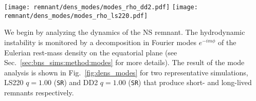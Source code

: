 \begin{figure*}[t]
    \centering 
    \texttt{[image: remnant/dens\_modes/modes\_rho\_dd2.pdf]}
    \texttt{[image: remnant/dens\_modes/modes\_rho\_ls220.pdf]}
    \caption{Modes analysis for exemplary equal-mass long-live and short-lived
        remnants. The evolution of the $m=2$ and the $m=1$ monitored by
        Eq.~\eqref{eq:modes} is shown for the DD2 and LS220 remnant with and
        without turbulent viscosity. The $m=2$ mode in the long-lived
        remnant is strongly damped by the emission of gravitational
        radiation and becomes comparable to the $m=1$ mode on a timescale of
        ${\gtrsim}20\,$ms. Turbulent viscosity sustain the $m=2$ mode for
        a longer period. The $m=2$ mode is instead dominant to collapse in
        the short-lived remnant.
        (Adopted from \cite{Nedora:2020pak}).
    }
    \label{fig:dens_modes}
\end{figure*}

We begin by analyzing the \pmerg{} dynamics of the \ac{NS} remnant.
The hydrodynamic instability is monitored by a decomposition in Fourier modes
$e^{-i m \phi}$ of the Eulerian rest-mass density on the equatorial plane 
(see Sec.~\ref{sec:bns_sims:method:modes} for more details).
%
%
The result of the mode analysis is shown in Fig.~\ref{fig:dens_modes} for two 
representative simulations, 
LS220 $q=1.00$ (\texttt{SR}) %
and 
DD2 $q=1.00$ (\texttt{SR})  
that produce short- and long-lived remnants respectively.

